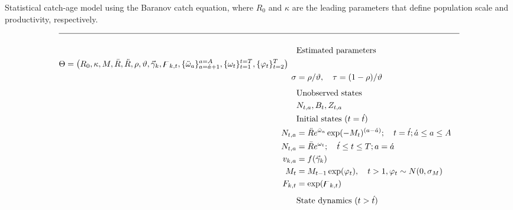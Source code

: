 \begin{table}[!tpb]
  \centering
\caption{Statistical catch-age model using the Baranov catch
equation, where $R_0$ and $\kappa$ are the leading parameters that define population scale and productivity, respectively.}\label{Table4}
\tableEq
    \begin{align}
        \hline \nonumber \\
        &\mbox{Estimated parameters} \nonumber\\
        \begin{split}
        \Theta&= 
        		\left(R_0,\kappa,M,\bar{R},\ddot{R},\rho,\vartheta,
		\vec{\gamma}_{k}
				,\digamma_{k,t}, %
		 \{\ddot{\omega}_a\}_{a=\acute{a}+1}^{a=A},
		 \{\omega_t\}_{t=1}^{t=T},
        		\{\varphi_t \}_{t=2}^T\right)
	\end{split} \label{T4.1}\\
        \sigma&=\rho /\vartheta, \quad
        \tau=(1-\rho)/\vartheta\label{T4.2}\\[1ex]
        &\mbox{Unobserved states} \nonumber\\
        &N_{t,a},B_t,Z_{t,a}	\label{T4.3}\\
        &\mbox{Initial states ($t=\acute{t}$)} \nonumber\\
        N_{t,a}&=\ddot{R}e^{\ddot{\omega}_{a}} \exp(-M_t)^{(a-\acute{a})};
        	\quad t=\acute{t};  \acute{a}\leq a\leq A \label{T4.4}\\
        N_{t,a}&=\bar{R}e^{\omega_{t}} ;\quad \acute{t}\leq t\leq T;  
        	a=\acute{a} \label{T4.5}\\
        v_{k,a}&=f(\vec{\gamma}_k) \label{T4.6}\\
        M_t &= M_{t-1} \exp(\varphi_t), \quad t>1, \varphi_t \sim N(0,\sigma_M) \label{T4.6b}\\
        F_{k,t}&= \exp(\digamma_{k,t}) \label{T4.7}\\[1ex]
        &\mbox{State dynamics ($t>\acute{t}$)} \nonumber\\

\end{align}
\end{table}
